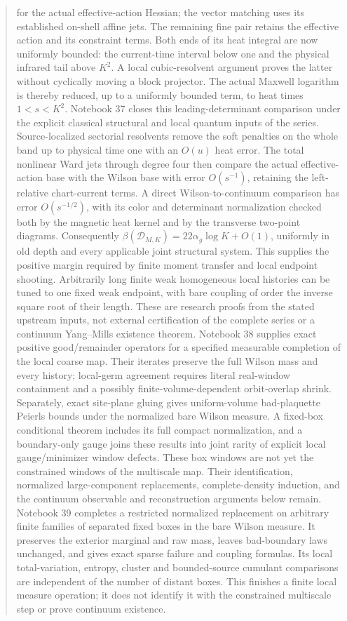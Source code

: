 \documentclass[11pt]{article}
\theoremstyle{remark}
\begin{document}
\begin{abstract}
for the actual effective-action Hessian; the vector matching
uses its established on-shell affine jets. The remaining fine
pair retains the effective action and its constraint terms.
Both ends of its heat integral are now uniformly bounded:
the current-time interval below one and the physical infrared
tail above \(K^2\). A local cubic-resolvent argument proves
the latter without cyclically moving a block projector.
The actual Maxwell logarithm is thereby reduced, up to a
uniformly bounded term, to heat times \(1<s<K^2\).
Notebook 37 closes this leading-determinant comparison under the
explicit classical structural and local quantum inputs of the series.
Source-localized sectorial resolvents remove the soft penalties on
the whole band up to physical time one with an \(O(u)\) heat error.
The total nonlinear Ward jets through degree four then compare the
actual effective-action base with the Wilson base with error \(O(s^{-1})\),
retaining the left-relative chart-current terms. A direct
Wilson-to-continuum comparison has error \(O(s^{-1/2})\), with its
color and determinant normalization checked both by the magnetic
heat kernel and by the transverse two-point diagrams. Consequently
\(\beta(\mathcal D_{M,K})=22\alpha_g\log K+O(1)\), uniformly in old
depth and every applicable joint structural system. This supplies
the positive margin required by finite moment transfer and local
endpoint shooting. Arbitrarily long finite weak homogeneous local
histories can be tuned to one fixed weak endpoint, with bare coupling
of order the inverse square root of their length. These are research
proofs from the stated upstream inputs, not external certification
of the complete series or a continuum Yang--Mills existence theorem.
Notebook 38 supplies exact positive good/remainder operators
for a specified measurable completion of the local coarse map.
Their iterates preserve the full Wilson mass and every history;
local-germ agreement requires literal real-window containment
and a possibly finite-volume-dependent orbit-overlap shrink.
Separately, exact site-plane gluing gives uniform-volume
bad-plaquette Peierls bounds under the normalized bare Wilson
measure. A fixed-box conditional theorem includes its full
compact normalization, and a boundary-only gauge joins these
results into joint rarity of explicit local gauge/minimizer
window defects. These box windows are not yet the constrained
windows of the multiscale map. Their identification, normalized
large-component replacements, complete-density induction, and
the continuum observable and reconstruction arguments below
remain. Notebook 39 completes a restricted normalized replacement
on arbitrary finite families of separated fixed boxes in the bare
Wilson measure. It preserves the exterior marginal and raw mass,
leaves bad-boundary laws unchanged, and gives exact sparse failure
and coupling formulas. Its local total-variation, entropy, cluster
and bounded-source cumulant comparisons are independent of the
number of distant boxes. This finishes a finite local measure
operation; it does not identify it with the constrained multiscale
step or prove continuum existence.
\end{abstract}
\end{document}
